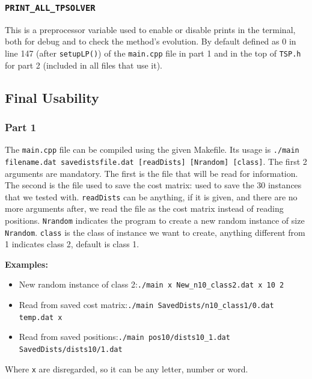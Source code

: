 \documentclass[a4paper,12pt]{article}
\begin{document}
			\subsubsection{\texttt{PRINT\_ALL\_TPSOLVER}}
				This is a preprocessor variable used to enable or disable prints in the terminal, both for debug and to check the method's evolution.
				By default defined as $ 0 $ in line 147 (after \texttt{setupLP()}) of the \texttt{main.cpp} file in part 1 and in the top of \texttt{TSP.h} for part 2 (included in all files that use it).
				
		\subsection{Final Usability}
			\subsubsection{Part 1}
				The \texttt{main.cpp} file can be compiled using the given Makefile.
				Its usage is \texttt{./main filename.dat savedistsfile.dat [readDists] [Nrandom] [class]}.
				The first 2 arguments are mandatory. 
				The first is the file that will be read for information.
				The second is the file used to save the cost matrix: used to save the 30 instances that we tested with.
				\texttt{readDists} can be anything, if it is given, and there are no more arguments after, we read the file as the cost matrix instead of reading positions.
				\texttt{Nrandom} indicates the program to create a new random instance of size \texttt{Nrandom}.
				\texttt{class} is the class of instance we want to create, anything different from 1 indicates class 2, default is class 1.
				
				\textbf{Examples:}
				\begin{itemize}
					\item New random instance of class 2:\texttt{./main x New\_n10\_class2.dat x 10 2}
					\item Read from saved cost matrix:\texttt{./main SavedDists/n10\_class1/0.dat temp.dat x}
					\item Read from saved positions:\texttt{./main pos10/dists10\_1.dat SavedDists/dists10/1.dat}
				\end{itemize}
				Where \texttt{x} are disregarded, so it can be any letter, number or word.
							
\end{document}
